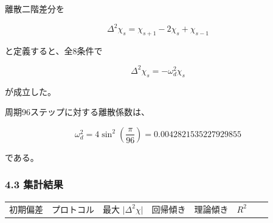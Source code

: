 \documentclass[
  a4paper,
]{ltjsarticle}
\newcounter{none} %
\begin{document}
離散二階差分を

\[
\Delta^2\chi_s
=\chi_{s+1}-2\chi_s+\chi_{s-1}
\]

と定義すると、全8条件で

\[
\Delta^2\chi_s
=-\omega_d^2\chi_s
\]

が成立した。

周期96ステップに対する離散係数は、

\[
\omega_d^2
=4\sin^2\left(\frac{\pi}{96}\right)
=0.0042821535227929855
\]

である。

\subsubsection{4.3 集計結果}\label{ux96c6ux8a08ux7d50ux679c}

{\def\LTcaptype{none} %
\begin{longtable}[]{@{}
  >{\raggedleft\arraybackslash}p{}
  >{\raggedright\arraybackslash}p{}
  >{\raggedleft\arraybackslash}p{}
  >{\raggedleft\arraybackslash}p{}
  >{\raggedleft\arraybackslash}p{}
  >{\raggedleft\arraybackslash}p{}
  >{\raggedleft\arraybackslash}p{}
  >{\raggedleft\arraybackslash}p{}@{}}
\toprule\noalign{}
\begin{minipage}[b]{\linewidth}\raggedleft
初期偏差
\end{minipage} & \begin{minipage}[b]{\linewidth}\raggedright
プロトコル
\end{minipage} & \begin{minipage}[b]{\linewidth}\raggedleft
最大 \(\lvert\Delta^2\chi\rvert\)
\end{minipage} & \begin{minipage}[b]{\linewidth}\raggedleft
回帰傾き
\end{minipage} & \begin{minipage}[b]{\linewidth}\raggedleft
理論傾き
\end{minipage} & \begin{minipage}[b]{\linewidth}\raggedleft
\(R^2\)
\end{minipage} & \begin{minipage}[b]{\linewidth}\raggedleft

\end{minipage}
\end{longtable}}
\end{document}
